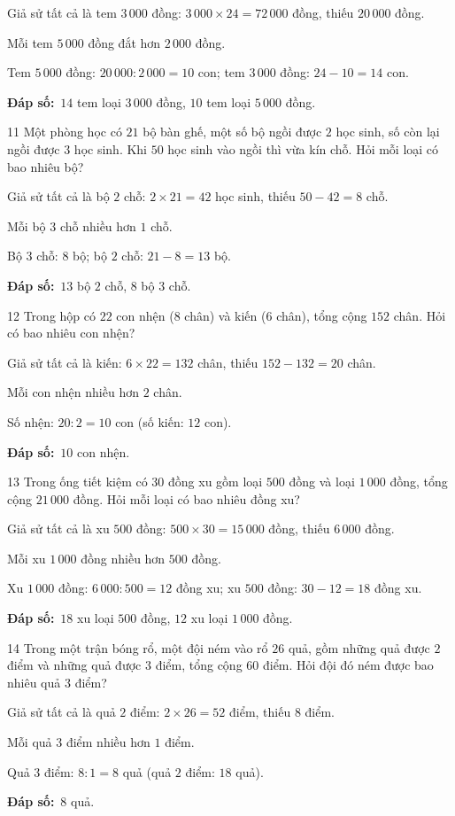 \documentclass[11pt]{article}
\newif\ifsol \solfalse
\providecommand{\AnsWord}{Đáp số}
\newcommand{\dapso}[1]{\par\textbf{\AnsWord:}\ #1}
\newcommand{\probsol}[1]{%
  \begin{lrbox}{\solmeasure}\begin{minipage}{\dimexpr\linewidth-24pt\relax}#1\end{minipage}\end{lrbox}%
  \ifsol
    \begin{solbox}#1\end{solbox}%
  \else
    \setlength{\solht}{\dimexpr\ht\solmeasure+\dp\solmeasure+0.85cm\relax}%
    \ifdim\solht<1.35cm\setlength{\solht}{1.35cm}\fi
    \begin{tcolorbox}[colback=white,colframe=Line,boxrule=0.8pt,arc=5pt,
      left=8pt,right=8pt,top=4pt,bottom=4pt,height=\solht]{\footnotesize\color{Slate}\itshape\WorkWord}\end{tcolorbox}%
  \fi}
\newcommand{\gap}{\vspace{0.3cm}}
\def\WorkWord{Bài làm:}
\def\AnsWord{Đáp số}
\begin{document}
\probsol{
Giả sử tất cả là tem $3\,000$ đồng: $3\,000\times24=72\,000$ đồng, thiếu $20\,000$ đồng.\par
Mỗi tem $5\,000$ đồng đắt hơn $2\,000$ đồng.\par Tem $5\,000$ đồng: $20\,000:2\,000=10$ con; tem $3\,000$ đồng: $24-10=14$ con.
\dapso{$14$ tem loại $3\,000$ đồng, $10$ tem loại $5\,000$ đồng.}}
\gap
\begin{probbox}{11}{\relax}
Một phòng học có $21$ bộ bàn ghế, một số bộ ngồi được $2$ học sinh, số còn lại ngồi được $3$ học sinh. Khi $50$ học sinh vào ngồi thì vừa kín chỗ. Hỏi mỗi loại có bao nhiêu bộ?
\end{probbox}
\probsol{
Giả sử tất cả là bộ $2$ chỗ: $2\times21=42$ học sinh, thiếu $50-42=8$ chỗ.\par
Mỗi bộ $3$ chỗ nhiều hơn $1$ chỗ.\par Bộ $3$ chỗ: $8$ bộ; bộ $2$ chỗ: $21-8=13$ bộ.
\dapso{$13$ bộ $2$ chỗ, $8$ bộ $3$ chỗ.}}
\gap
\begin{probbox}{12}{\relax}
Trong hộp có $22$ con nhện ($8$ chân) và kiến ($6$ chân), tổng cộng $152$ chân. Hỏi có bao nhiêu con nhện?
\end{probbox}
\probsol{
Giả sử tất cả là kiến: $6\times22=132$ chân, thiếu $152-132=20$ chân.\par
Mỗi con nhện nhiều hơn $2$ chân.\par Số nhện: $20:2=10$ con (số kiến: $12$ con).
\dapso{$10$ con nhện.}}
\gap
\begin{probbox}{13}{\relax}
Trong ống tiết kiệm có $30$ đồng xu gồm loại $500$ đồng và loại $1\,000$ đồng, tổng cộng $21\,000$ đồng. Hỏi mỗi loại có bao nhiêu đồng xu?
\end{probbox}
\probsol{
Giả sử tất cả là xu $500$ đồng: $500\times30=15\,000$ đồng, thiếu $6\,000$ đồng.\par
Mỗi xu $1\,000$ đồng nhiều hơn $500$ đồng.\par Xu $1\,000$ đồng: $6\,000:500=12$ đồng xu; xu $500$ đồng: $30-12=18$ đồng xu.
\dapso{$18$ xu loại $500$ đồng, $12$ xu loại $1\,000$ đồng.}}
\gap
\begin{probbox}{14}{\relax}
Trong một trận bóng rổ, một đội ném vào rổ $26$ quả, gồm những quả được $2$ điểm và những quả được $3$ điểm, tổng cộng $60$ điểm. Hỏi đội đó ném được bao nhiêu quả $3$ điểm?
\end{probbox}
\probsol{
Giả sử tất cả là quả $2$ điểm: $2\times26=52$ điểm, thiếu $8$ điểm.\par
Mỗi quả $3$ điểm nhiều hơn $1$ điểm.\par Quả $3$ điểm: $8:1=8$ quả (quả $2$ điểm: $18$ quả).
\dapso{$8$ quả.}}
\end{document}
